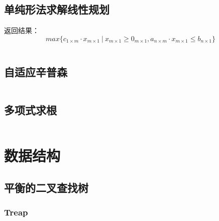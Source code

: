 \documentclass[landscape, oneside, a4paper, cs4size]{book}
\newcommand{\cppcode}[1]{
	\inputminted[mathescape,
	frame=lines,linenos]{cpp}{source/#1}
}
\begin{document}
\begin{multicols}{2}
\begin{spacing}{0.8}
\cppcode{numerical-algorithm/fast-fourier-transform.cpp}


\subsection{单纯形法求解线性规划}


返回结果：$$max\{c_{1 \times m} \cdot x_{m \times 1} \ | \ x_{m \times 1} \geq 0_{m \times 1}, a_{n \times m} \cdot x_{m \times 1} \leq b_{n \times 1}\}$$


\cppcode{numerical-algorithm/linear-programming-simplex.cpp}


\subsection{自适应辛普森}


\cppcode{numerical-algorithm/adaptive-simpson.cpp}



\subsection{多项式求根}


\cppcode{numerical-algorithm/polyroot.cpp}








\section{数据结构}


\subsection{平衡的二叉查找树}


\subsubsection{Treap}



\end{spacing}
\end{multicols}
\end{document}
